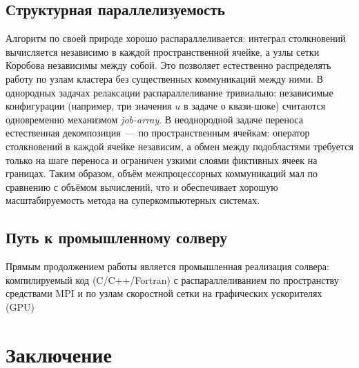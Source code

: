 \documentclass[14pt,a4paper]{extreport}
\numberwithin{equation}{chapter}
\numberwithin{figure}{chapter}
\numberwithin{table}{chapter}
\begin{document}
\section{Структурная параллелизуемость}

Алгоритм по своей природе хорошо распараллеливается: интеграл столкновений вычисляется независимо в каждой
пространственной ячейке, а узлы сетки Коробова независимы между собой.
Это позволяет естественно распределять работу по узлам кластера без существенных коммуникаций между ними.
В однородных задачах релаксации распараллеливание тривиально: независимые конфигурации (например, три значения $u$ в
задаче о квази-шоке) считаются одновременно механизмом \emph{job-array}.
В неоднородной задаче переноса естественная декомпозиция~--- по пространственным ячейкам: оператор столкновений в каждой
ячейке независим, а обмен между подобластями требуется только на шаге переноса и ограничен узкими слоями фиктивных ячеек
на границах.
Таким образом, объём межпроцессорных коммуникаций мал по сравнению с объёмом вычислений, что и обеспечивает хорошую
масштабируемость метода на суперкомпьютерных системах.

\section{Путь к промышленному солверу}
\label{sec:hpcpath}

Прямым продолжением работы является промышленная реализация солвера: компилируемый код (C/C++/Fortran) с
распараллеливанием по пространству средствами MPI и по узлам скоростной сетки на графических ускорителях (GPU)


\chapter*{Заключение}
\end{document}
